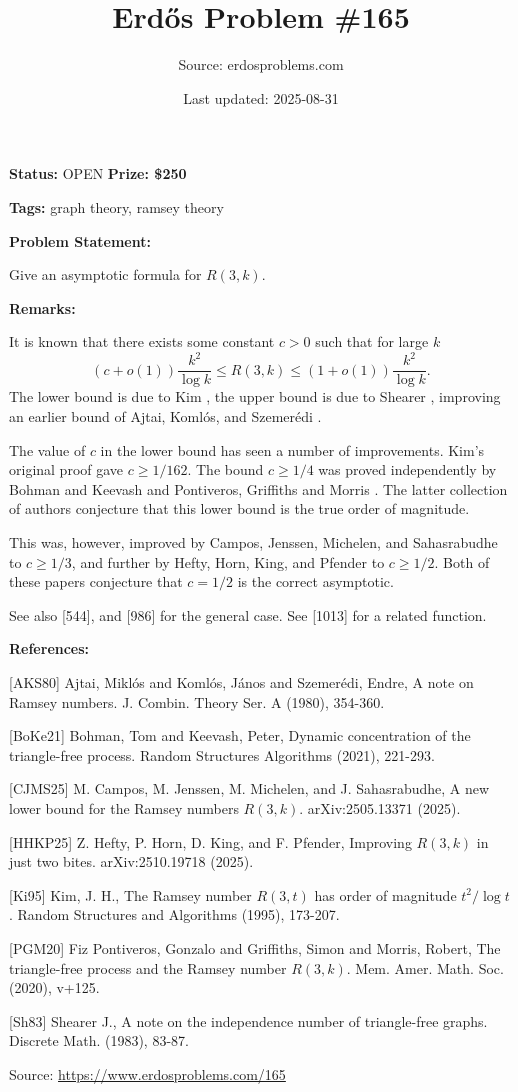 \documentclass{article}
\title{Erd\H{o}s Problem \#165}
\date{Last updated: 2025-08-31}
\author{Source: erdosproblems.com}
\begin{document}
\maketitle

\noindent\textbf{Status:} OPEN \quad \textbf{Prize: \$250}

\noindent\textbf{Tags:} graph theory, ramsey theory

\medskip
\noindent\textbf{Problem Statement:}

Give an asymptotic formula for $R(3,k)$.

\bigskip
\noindent\textbf{Remarks:}

It is known that there exists some constant $c>0$ such that for large $k$\[(c+o(1))\frac{k^2}{\log k}\leq R(3,k) \leq (1+o(1))\frac{k^2}{\log k}.\]The lower bound is due to Kim \cite{Ki95}, the upper bound is due to Shearer \cite{Sh83}, improving an earlier bound of Ajtai, Koml\'{o}s, and Szemer\'{e}di \cite{AKS80}. 

The value of $c$ in the lower bound has seen a number of improvements. Kim's original proof gave $c\geq 1/162$. The bound $c\geq 1/4$ was proved independently by Bohman and Keevash \cite{BoKe21} and Pontiveros, Griffiths and Morris \cite{PGM20}. The latter collection of authors conjecture that this lower bound is the true order of magnitude.

This was, however, improved by Campos, Jenssen, Michelen, and Sahasrabudhe \cite{CJMS25} to $c\geq 1/3$, and further by Hefty, Horn, King, and Pfender \cite{HHKP25} to $c\geq 1/2$. Both of these papers conjecture that $c=1/2$ is the correct asymptotic.

See also [544], and [986] for the general case. See [1013] for a related function.

\bigskip
\noindent\textbf{References:}

[AKS80] Ajtai, Mikl\'{o}s and Koml\'{o}s, J\'{a}nos and Szemer\'{e}di, Endre, A note on Ramsey numbers. J. Combin. Theory Ser. A (1980), 354-360.
 
 [BoKe21] Bohman, Tom and Keevash, Peter, Dynamic concentration of the triangle-free process. Random Structures Algorithms (2021), 221-293.
 
 [CJMS25] M. Campos, M. Jenssen, M. Michelen, and J. Sahasrabudhe, A new lower bound for the Ramsey numbers $R(3,k)$. arXiv:2505.13371 (2025).
 
 [HHKP25] Z. Hefty, P. Horn, D. King, and F. Pfender, Improving $R(3,k)$ in just two bites. arXiv:2510.19718 (2025).
 
 [Ki95] Kim, J. H., The Ramsey number $R(3,t)$ has order of magnitude $t^2/\log t$. Random Structures and Algorithms (1995), 173-207.
 
 [PGM20] Fiz Pontiveros, Gonzalo and Griffiths, Simon and Morris, Robert, The triangle-free process and the Ramsey number $R(3,k)$. Mem. Amer. Math. Soc. (2020), v+125.
 
 [Sh83] Shearer J., A note on the independence number of triangle-free graphs. Discrete Math. (1983), 83-87.

\bigskip
\noindent\small{Source: \url{https://www.erdosproblems.com/165}}
\end{document}
